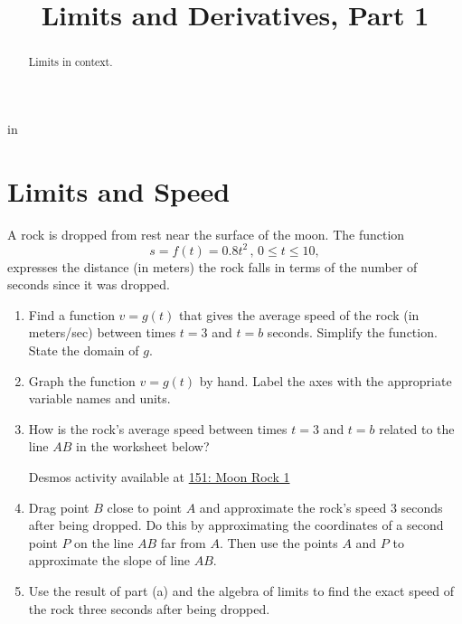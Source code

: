 \documentclass{ximera}
\title{Limits and Derivatives, Part 1}
\newcommand{\pskip}{\vskip 0.1 in}
\begin{document}
\begin{abstract}
Limits in context.
\end{abstract}
\maketitle


\pskip

\section{Limits and Speed}

\begin{example}  \label{Ex:9u4dfg9}
A rock is dropped from rest near the surface of the moon. The function 
\[
      s =  f(t) = 0.8 t^2 \, , \, 0 \leq t \leq 10,
\]
expresses the distance (in meters) the rock falls in terms of the number of seconds since it was dropped.

\begin{enumerate}
\item Find a function $v=g(t)$ that gives the average speed of the rock (in meters/sec) between times $t=3$ and $t=b$ seconds. Simplify the function. State the domain of $g$.

\item Graph the function $v=g(t)$ by hand. Label the axes with the appropriate variable names and units.

\item How is the rock's average speed between times $t=3$ and $t=b$ related to the line $AB$ in the worksheet below? 

\begin{onlineOnly}
    \begin{center}
\end{center}
\end{onlineOnly}

Desmos activity available at
\href{https://www.desmos.com/calculator/tcti9t3iub}{151: Moon Rock 1}

\item Drag point $B$ close to point $A$ and approximate the rock's speed $3$ seconds after being dropped. Do this by approximating the coordinates of a second point $P$ on the line $AB$ far from $A$. Then use the points $A$ and $P$ to approximate the slope of line $AB$.

\item Use the result of part (a) and the algebra of limits to find the exact speed of the rock three seconds after being dropped.


\end{enumerate}
\end{example}
\end{document}
